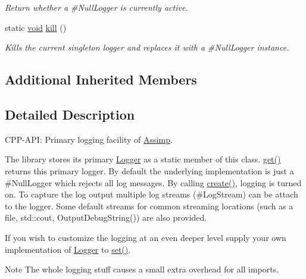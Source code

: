 \begin{DoxyCompactItemize}
\begin{DoxyCompactList}\small\item\em Return whether a \#\-Null\-Logger is currently active. \end{DoxyCompactList}\item 
static \hyperlink{wglew_8h_aeea6e3dfae3acf232096f57d2d57f084}{void} \hyperlink{class_assimp_1_1_default_logger_a0b1da096d7442af5a4a4cb5ebb2540f7}{kill} ()
\begin{DoxyCompactList}\small\item\em Kills the current singleton logger and replaces it with a \#\-Null\-Logger instance. \end{DoxyCompactList}\end{DoxyCompactItemize}
\subsection*{Additional Inherited Members}


\subsection{Detailed Description}
C\-P\-P-\/\-A\-P\-I\-: Primary logging facility of \hyperlink{namespace_assimp}{Assimp}. 

The library stores its primary \hyperlink{class_assimp_1_1_logger_a784e6d1a741072b17bab32a6a41055e8}{Logger} as a static member of this class. \hyperlink{class_assimp_1_1_default_logger_a7d0a53f2db66945ade30094330a77ba4}{get()} returns this primary logger. By default the underlying implementation is just a \#\-Null\-Logger which rejects all log messages. By calling \hyperlink{class_assimp_1_1_default_logger_adccb11f85f8b0ef226c382e11ba665c3}{create()}, logging is turned on. To capture the log output multiple log streams (\#\-Log\-Stream) can be attach to the logger. Some default streams for common streaming locations (such as a file, std\-::cout, Output\-Debug\-String()) are also provided.

If you wish to customize the logging at an even deeper level supply your own implementation of \hyperlink{class_assimp_1_1_logger_a784e6d1a741072b17bab32a6a41055e8}{Logger} to \hyperlink{class_assimp_1_1_default_logger_a9daba548026045b99813c760c2842ed2}{set()}. \begin{DoxyNote}{Note}
The whole logging stuff causes a small extra overhead for all imports. 
\end{DoxyNote}


